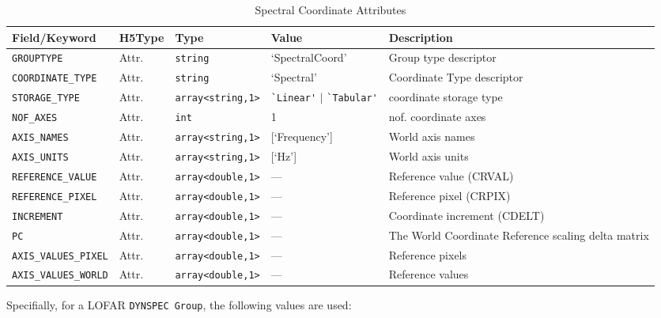\documentclass[a4paper,10pt,bibtotoc]{scrartcl}
\begin{document}
\vspace{20pt}
\begin{table}[htbp]
\begin{small}
\begin{center}
  \begin{tabular}{|llllp{5cm}|}
    \hline
    \sc Field/Keyword & \sc H5Type & \sc Type & \sc Value & \sc Description \\
    \hline \hline
    \verb|GROUPTYPE|  & Attr.  & \verb|string| & `SpectralCoord' & Group type descriptor\\
    \verb|COORDINATE_TYPE| & Attr. & \verb|string| & `Spectral' & Coordinate Type  descriptor \\
    \verb|STORAGE_TYPE| & Attr. & \small\verb|array<string,1>| & \small
    	\verb|`Linear'| $|$ \verb|`Tabular'| & coordinate storage type \\    
    \verb|NOF_AXES|   & Attr. & \verb|int| & 1 & nof. coordinate axes \\
    \verb|AXIS_NAMES| & Attr. & \verb|array<string,1>| & [`Frequency'] & World axis names \\
    \verb|AXIS_UNITS| & Attr. & \verb|array<string,1>| & [`Hz'] & World axis units \\
    \verb|REFERENCE_VALUE| & Attr. & \verb|array<double,1>| & --- & Reference value (CRVAL) \\
    \verb|REFERENCE_PIXEL| & Attr. & \verb|array<double,1>| & --- & Reference pixel (CRPIX) \\
    \verb|INCREMENT| & Attr. & \verb|array<double,1>| & --- & Coordinate increment (CDELT) \\
    \verb|PC|    & Attr. & \verb|array<double,1>| & ---& The World Coordinate Reference scaling delta matrix \\
    \verb|AXIS_VALUES_PIXEL| & Attr. & \verb|array<double,1>| & --- & Reference pixels \\
    \verb|AXIS_VALUES_WORLD| & Attr. & \verb|array<double,1>| & --- & Reference values \\
 \hline
\end{tabular}
\end{center}
\end{small}
\caption{Spectral Coordinate Attributes}
\label{tab:spectral coords attributes}
\end{table}

Specifially, for a LOFAR \texttt{DYNSPEC Group}, the following values are used:
\end{document}
